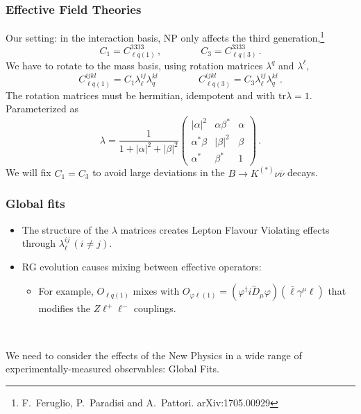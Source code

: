 \documentclass[mathserif, 10pt]{beamer}
\begin{document}
\begin{frame}
    \frametitle{Effective Field Theories}

    Our setting: in the interaction basis, NP only affects the third generation,\footnote[1]{F.~Feruglio, P.~Paradisi and A.~Pattori. arXiv:1705.00929}
    $$C_1 = C_{\ell q(1)}^{3333}\,,\qquad\qquad C_3 = C_{\ell q(3)}^{3333}\,.$$
    We have to rotate to the mass basis, using rotation matrices $\lambda^q$ and $\lambda^\ell$,
    $$C_{\ell q(1)}^{ijkl} = C_1 \lambda_\ell^{ij}\lambda_q^{kl}\,\qquad\qquad C_{\ell q(3)}^{ijkl} = C_3 \lambda_\ell^{ij}\lambda_q^{kl}\,. $$
    The rotation matrices must be hermitian, idempotent and with $\mathrm{tr}\lambda =1$. Parameterized as
    $$ \lambda = \frac{1}{1+|\alpha|^2+|\beta|^2}\begin{pmatrix}
            |\alpha|^2 & \alpha \beta^* & \alpha \\ \alpha^* \beta & |\beta|^2 & \beta \\ \alpha^* & \beta^* & 1
        \end{pmatrix}\,. $$
    We will fix $C_1 = C_3$ to avoid large deviations in the $B\to K^{(*)}\nu\overline{\nu}$ decays.
\end{frame}

\begin{frame}
    \frametitle{Global fits}
    \begin{itemize}
        \item The structure of the $\lambda$ matrices creates Lepton Flavour Violating effects through $\lambda_\ell^{ij}\, (i\neq j)$.
        \item RG evolution causes mixing between effective operators:
              \begin{itemize}
                  \item For example, $O_{\ell q(1)}$ mixes with $O_{\varphi \ell(1)} = (\varphi^\dagger i \overleftrightarrow D_{\mu} \varphi)(\bar{\ell} \gamma^\mu \ell )$ that modifies the $Z\ell^+\ell^-$ couplings.
              \end{itemize}
    \end{itemize}

    ~

    We need to consider the effects of the New Physics in a wide range of experimentally-measured observables: Global Fits.


\end{frame}
\end{document}
